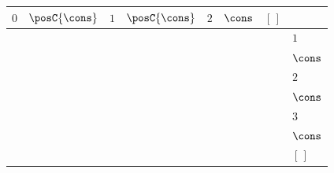 {\scriptsize\setlength{\tabcolsep}{1.5pt}%
\begin{tabular}{ccccccc|l}
$0$ & \cellcolor{blue!10}$\posC{\cons}$ & \cellcolor{blue!10}$1$ & \cellcolor{blue!10}$\posC{\cons}$ & $2$ & $\cons$ & $[\,]$ & \\ \hline
\gcell{$\posD{\bullet}$} & \gcell{$\posC{\circ}$} & \gcell{$$} & \gcell{$$} & \gcell{$$} & \gcell{$$} & \gcell{$$} & $1$ \\
\gcell{$$} & \gcell{$\posC{\circ}$} & \gcell{$$} & \gcell{$$} & \gcell{$$} & \gcell{$$} & \gcell{$$} & $\cons$ \\
\cellcolor{blue!10}\gcell{$$} & \cellcolor{blue!10}\gcell{$\posC{\circ}$} & \cellcolor{blue!10}\gcell{$\posD{\bullet}$} & \cellcolor{blue!10}\gcell{$\posC{\circ}$} & \cellcolor{blue!10}\gcell{$$} & \cellcolor{blue!10}\gcell{$$} & \cellcolor{blue!10}\gcell{$$} & \cellcolor{blue!25}$2$ \\
\gcell{$$} & \gcell{$\posC{\circ}$} & \gcell{$$} & \gcell{$\posC{\circ}$} & \gcell{$$} & \gcell{$$} & \gcell{$$} & $\cons$ \\
\gcell{$$} & \gcell{$\posC{\circ}$} & \gcell{$$} & \gcell{$\posC{\circ}$} & \gcell{$\posD{\bullet}$} & \gcell{$\posC{\circ}$} & \gcell{$$} & $3$ \\
\gcell{$$} & \gcell{$\posC{\circ}$} & \gcell{$$} & \gcell{$\posC{\circ}$} & \gcell{$$} & \gcell{$\posC{\circ}$} & \gcell{$$} & $\cons$ \\
\gcell{$$} & \gcell{$\posC{\circ}$} & \gcell{$$} & \gcell{$\posC{\circ}$} & \gcell{$$} & \gcell{$\posC{\circ}$} & \gcell{$\posC{\circ}$} & $[\,]$ \\
\end{tabular}}
